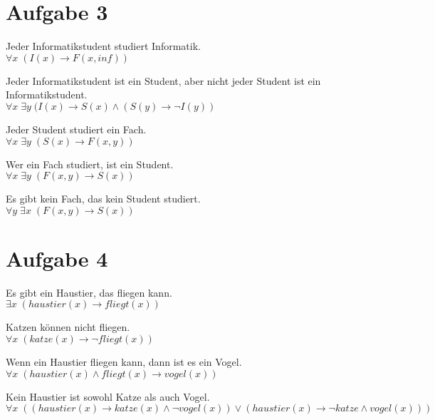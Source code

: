 \documentclass{scrreprt}
\begin{document}
\section{Aufgabe 3}
\begin{anumerate}
\item Jeder Informatikstudent studiert Informatik.\\
$\forall x \; (I(x) \to F(x,inf))$
\item Jeder Informatikstudent ist ein Student, aber nicht jeder Student ist ein Informatikstudent.\\
$\forall x \; \exists y \; (I(x) \to S(x) \wedge (S(y) \to \neg I(y))  $
\item Jeder Student studiert ein Fach.\\
$\forall x \; \exists y \; (S(x) \to F(x,y))$
\item Wer ein Fach studiert, ist ein Student.\\
$\forall x \; \exists y \; (F(x,y) \to S(x))$
\item Es gibt kein Fach, das kein Student studiert.\\
$\forall y \; \exists x \; (F(x,y) \to S(x))$
\end{anumerate}

\section{Aufgabe 4}
\begin{anumerate}
\item Es gibt ein Haustier, das fliegen kann.\\
$\exists x\; (haustier(x) \to fliegt (x))$
\item Katzen können nicht fliegen.\\
$\forall x\; (katze(x) \to \neg fliegt(x))$
\item Wenn ein Haustier fliegen kann, dann ist es ein Vogel.\\
$\forall x\; (haustier(x) \wedge fliegt(x) \to vogel(x))$
\item  Kein Haustier ist sowohl Katze als auch Vogel.\\
$\forall x\; ((haustier(x) \to katze(x) \wedge \neg vogel(x)) \vee (haustier(x)\to \neg katze \wedge vogel(x)))$
\end{anumerate}
\end{document}
